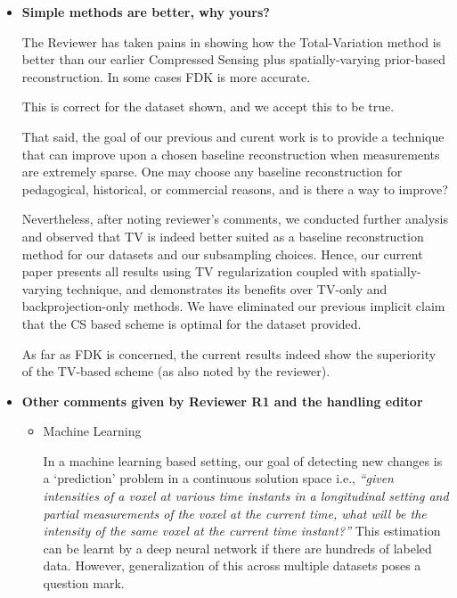 \documentclass{article}
\begin{document}
\begin{itemize}
\item \textbf{Simple methods are better, why yours?}
  
The Reviewer has taken pains in showing how the Total-Variation method
is better than our earlier Compressed Sensing plus spatially-varying
prior-based reconstruction. In some cases FDK is more accurate.

This is correct for the dataset shown, and we accept this to be true.

  That said, the goal of our previous and curent work is to provide a
  technique that can improve upon a chosen baseline reconstruction
  when measurements are extremely sparse. One may choose any baseline
  reconstruction for pedagogical, historical, or commercial reasons,
  and is there a way to improve?
  
  Nevertheless, after noting reviewer's comments, we conducted further
  analysis and observed that TV is indeed better suited as a baseline
  reconstruction method for our datasets and our subsampling
  choices. Hence, our current paper presents all results using TV
  regularization coupled with spatially-varying technique, and
  demonstrates its benefits over TV-only and backprojection-only
  methods.  We have eliminated our previous implicit claim that the CS
  based scheme is optimal for the dataset provided.

  As far as FDK is concerned, the current results indeed show the
  superiority of the TV-based scheme (as also noted by the reviewer).
  
\item \textbf{Other comments given by Reviewer R1 and the handling editor}

 \begin{itemize}
  \item {Machine Learning}
  
  In a machine learning based setting, our goal of detecting new
  changes is a `prediction' problem in a continuous solution space
  i.e., \textit{``given intensities of a voxel at various time
    instants in a longitudinal setting and partial measurements of the
    voxel at the current time, what will be the intensity of the same
    voxel at the current time instant?''} This estimation can be
  learnt by a deep neural network if there are hundreds of labeled
  data.  However, generalization of this across multiple datasets
  poses a question mark. 
  


\end{itemize}
\end{itemize}
\end{document}
